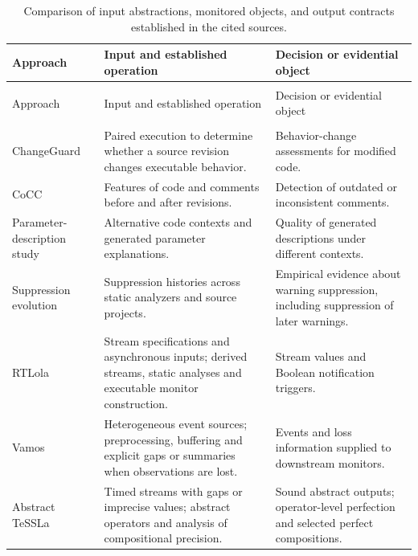 \documentclass[preprint,11pt]{elsarticle}
\begin{document}
{\small
\setlength{\tabcolsep}{4pt}
\renewcommand{\arraystretch}{1.12}
\setlength{\LTleft}{0pt}
\setlength{\LTright}{0pt}
\begin{longtable}{@{}>{\raggedright\arraybackslash}p{.235\linewidth}>{\raggedright\arraybackslash}p{.38\linewidth}>{\raggedright\arraybackslash}p{}@{}}
\caption{Comparison of input abstractions, monitored objects, and output contracts established in the cited sources.}\label{tab:related-matrix}\\
\toprule
Approach & Input and established operation & Decision or evidential object \\
\midrule
\endfirsthead
\multicolumn{3}{l}{Table~\thetable\ (continued)}\\
\toprule
Approach & Input and established operation & Decision or evidential object \\
\midrule
\endhead
\midrule
\multicolumn{3}{r}{Continued on next page}\\
\endfoot
\bottomrule
\endlastfoot
ChangeGuard \cite{groninger2025changeguard} & Paired execution to determine whether a source revision changes executable behavior. & Behavior-change assessments for modified code. \\
CoCC \cite{chen2024cocc} & Features of code and comments before and after revisions. & Detection of outdated or inconsistent comments. \\
Parameter-description study \cite{chen2026context} & Alternative code contexts and generated parameter explanations. & Quality of generated descriptions under different contexts. \\
Suppression evolution \cite{hu2025suppressed} & Suppression histories across static analyzers and source projects. & Empirical evidence about warning suppression, including suppression of later warnings. \\
RTLola \cite{baumeister2026rtlola} & Stream specifications and asynchronous inputs; derived streams, static analyses and executable monitor construction. & Stream values and Boolean notification triggers. \\
Vamos \cite{chalupa2025vamos} & Heterogeneous event sources; preprocessing, buffering and explicit gaps or summaries when observations are lost. & Events and loss information supplied to downstream monitors. \\
Abstract TeSSLa \cite{leucker2019partial} & Timed streams with gaps or imprecise values; abstract operators and analysis of compositional precision. & Sound abstract outputs; operator-level perfection and selected perfect compositions. \\

\end{longtable}}
\end{document}
